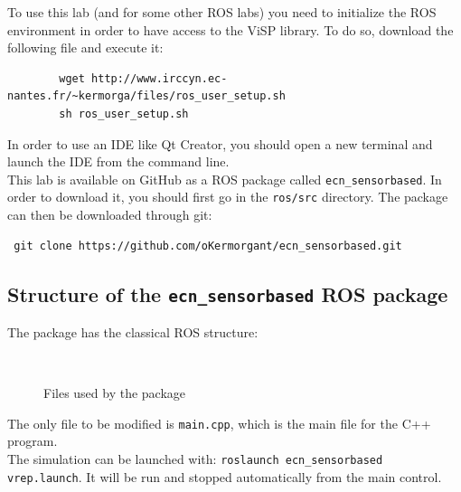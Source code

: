 \documentclass{ecnreport}
\begin{document}
To use this lab (and for some other ROS labs) you need to initialize the ROS environment in order to have access to the ViSP library.
To do so, download the following file and execute it:
\begin{center}\cppstyle
\begin{lstlisting}
        wget http://www.irccyn.ec-nantes.fr/~kermorga/files/ros_user_setup.sh
        sh ros_user_setup.sh
\end{lstlisting}
\end{center}In order to use an IDE like Qt Creator, you should open a new terminal and launch the IDE from the command line.\\

This lab is available on GitHub as a ROS package called \texttt{ecn\_sensorbased}. In order to download it, you should first go in the \texttt{ros/src} directory. The package can then be downloaded through git:
\begin{center}\cppstyle
\begin{lstlisting}
 git clone https://github.com/oKermorgant/ecn_sensorbased.git
\end{lstlisting}
\end{center}

\subsection{Structure of the \texttt{ecn\_sensorbased} ROS package}

The package has the classical ROS structure:
\begin{figure}[h]
\begin{minipage}{.25\linewidth} ~ \end{minipage}
\begin{minipage}{.5\linewidth}
\end{minipage}
\caption{Files used by the package}
\end{figure}

The only file to be modified is \texttt{main.cpp}, which is the main file for the C++ program. \\
The simulation can be launched with: \texttt{roslaunch ecn\_sensorbased vrep.launch}. It will be run and stopped automatically from the main control.
\end{document}
